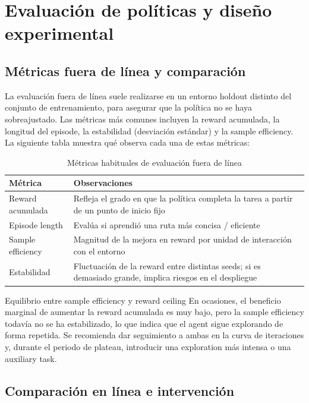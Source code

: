\section{Evaluación de políticas y diseño experimental}

\subsection{Métricas fuera de línea y comparación}

La evaluación fuera de línea suele realizarse en un entorno holdout distinto del conjunto de entrenamiento, para asegurar que la política no se haya sobreajustado. Las métricas más comunes incluyen la reward acumulada, la longitud del episode, la estabilidad (desviación estándar) y la sample efficiency. La siguiente tabla muestra qué observa cada una de estas métricas:

\begin{table}[H]
\centering
\begin{tabular}{lp{8cm}}
\toprule
Métrica & Observaciones \\
\midrule
Reward acumulada & Refleja el grado en que la política completa la tarea a partir de un punto de inicio fijo \\
Episode length & Evalúa si aprendió una ruta más concisa / eficiente \\
Sample efficiency & Magnitud de la mejora en reward por unidad de interacción con el entorno \\
Estabilidad & Fluctuación de la reward entre distintas seeds; si es demasiado grande, implica riesgos en el despliegue \\
\bottomrule
\end{tabular}
\caption{Métricas habituales de evaluación fuera de línea}
\end{table}

\begin{importantbox}{Equilibrio entre sample efficiency y reward ceiling}
En ocasiones, el beneficio marginal de aumentar la reward acumulada es muy bajo, pero la sample efficiency todavía no se ha estabilizado, lo que indica que el agent sigue explorando de forma repetida. Se recomienda dar seguimiento a ambas en la curva de iteraciones y, durante el periodo de plateau, introducir una exploration más intensa o una auxiliary task.
\end{importantbox}

\subsection{Comparación en línea e intervención}

